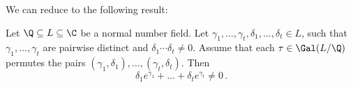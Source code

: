 We can reduce  to the following result:

\begin{thmn}
	Let \( \Q \subseteq L \subseteq \C \) be a normal number field.
	Let \( \gamma_1, \dotsc, \gamma_t, \delta_1, \dotsc, \delta_t \in L \), such that \( \gamma_1, \dotsc, \gamma_t \) are pairwise distinct and \( \delta_1 \dotsm \delta_t \neq 0 \).
	Assume that each \( \tau \in \Gal(L/\Q) \) permutes the pairs \( (\gamma_1, \delta_1), \dotsc, (\gamma_t, \delta_t) \).
	Then
	\[ \delta_1 e^{\gamma_1} + \dots + \delta_t e^{\gamma_t} \neq 0 \,. \]
\end{thmn}